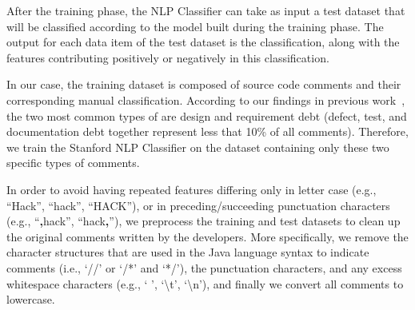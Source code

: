 After the training phase, the NLP Classifier can take as input a test dataset that will be classified according to the model built during the training phase. The output for each data item of the test dataset is the classification, along with the features contributing positively or negatively in this classification.

In our case, the training dataset is composed of source code comments and their corresponding manual classification.
According to our findings in previous work~\cite{Maldonado2015MTD}, the two most common types of \SATD are design and requirement debt (defect, test, and documentation debt together represent less that 10\% of all \SATD comments).
Therefore, we train the Stanford NLP Classifier on the dataset containing only these two specific types of \SATD comments.

In order to avoid having repeated features differing only in letter case (e.g., ``Hack'', ``hack'', ``HACK''), or in preceding/succeeding punctuation characters (e.g., ``\textbf{,}hack'', ``hack\textbf{,}''), we preprocess the training and test datasets to clean up the original comments written by the developers. More specifically, we remove the character structures that are used in the Java language syntax to indicate comments (i.e., `//' or `/*' and `*/'), the punctuation characters, and any excess whitespace characters (e.g., ` ', `\textbackslash t', `\textbackslash n'), and finally we convert all comments to lowercase.



